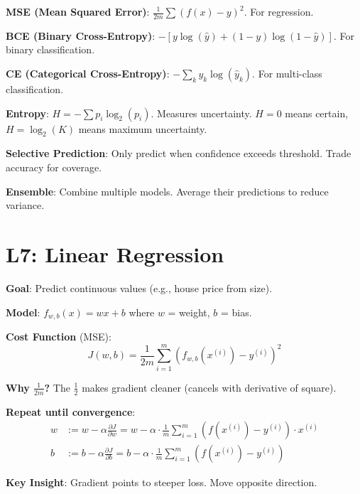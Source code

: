 \documentclass[11pt,a4paper]{article}
\begin{document}
\begin{definitionbox}

\textbf{MSE (Mean Squared Error)}: $\frac{1}{2m}\sum(f(x) - y)^2$. For regression.

\textbf{BCE (Binary Cross-Entropy)}: $-[y\log(\hat{y}) + (1-y)\log(1-\hat{y})]$. For binary classification.

\textbf{CE (Categorical Cross-Entropy)}: $-\sum_k y_k \log(\hat{y}_k)$. For multi-class classification.
\end{definitionbox}

\begin{definitionbox}

\textbf{Entropy}: $H = -\sum p_i \log_2(p_i)$. Measures uncertainty. $H=0$ means certain, $H=\log_2(K)$ means maximum uncertainty.

\textbf{Selective Prediction}: Only predict when confidence exceeds threshold. Trade accuracy for coverage.

\textbf{Ensemble}: Combine multiple models. Average their predictions to reduce variance.
\end{definitionbox}

\section{L7: Linear Regression}

\begin{definitionbox}

\textbf{Goal}: Predict continuous values (e.g., house price from size).

\textbf{Model}: $f_{w,b}(x) = wx + b$ where $w$ = weight, $b$ = bias.

\textbf{Cost Function} (MSE):
\[J(w,b) = \frac{1}{2m}\sum_{i=1}^{m}(f_{w,b}(x^{(i)}) - y^{(i)})^2\]

\textbf{Why $\frac{1}{2m}$?} The $\frac{1}{2}$ makes gradient cleaner (cancels with derivative of square).
\end{definitionbox}

\begin{examplebox}

\textbf{Repeat until convergence}:
\begin{align*}
w &:= w - \alpha \frac{\partial J}{\partial w} = w - \alpha \cdot \frac{1}{m}\sum_{i=1}^{m}(f(x^{(i)}) - y^{(i)}) \cdot x^{(i)} \\
b &:= b - \alpha \frac{\partial J}{\partial b} = b - \alpha \cdot \frac{1}{m}\sum_{i=1}^{m}(f(x^{(i)}) - y^{(i)})
\end{align*}

\textbf{Key Insight}: Gradient points to steeper loss. Move opposite direction.
\end{examplebox}
\end{document}
